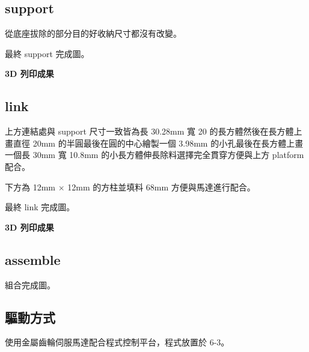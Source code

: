 \subsection*{support}

從底座拔除的部分目的好收納尺寸都沒有改變。

\newpage



最終 support 完成圖。

\textbf{3D 列印成果}

\subsection*{link}

上方連結處與 support 尺寸一致皆為長 30.28mm 寬 20 的長方體然後在長方體上畫直徑 20mm 的半圓最後在圓的中心繪製一個 3.98mm 的小孔最後在長方體上畫一個長 30mm 寬 10.8mm 的小長方體伸長除料選擇完全貫穿方便與上方 platform 配合。

下方為 12mm $\times$ 12mm 的方柱並填料 68mm 方便與馬達進行配合。

最終 link 完成圖。

\textbf{3D 列印成果}

\subsection*{assemble}

組合完成圖。

\subsection*{驅動方式}

使用金屬齒輪伺服馬達配合程式控制平台，程式放置於 6-3。


